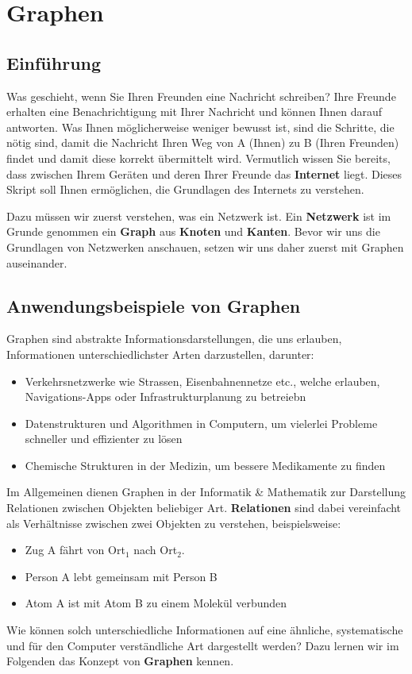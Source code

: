 \chapter{Graphen}

\section{Einführung}
Was geschieht, wenn Sie Ihren Freunden eine Nachricht schreiben? Ihre Freunde erhalten eine Benachrichtigung mit Ihrer Nachricht und können Ihnen darauf antworten. Was Ihnen möglicherweise weniger bewusst ist, sind die Schritte, die nötig sind, damit die Nachricht Ihren Weg von A (Ihnen) zu B (Ihren Freunden) findet und damit diese korrekt übermittelt wird. Vermutlich wissen Sie bereits, dass zwischen Ihrem Geräten und deren Ihrer Freunde das \textbf{Internet} liegt. Dieses Skript soll Ihnen ermöglichen, die Grundlagen des Internets zu verstehen.

Dazu müssen wir zuerst verstehen, was ein Netzwerk ist. Ein \textbf{Netzwerk} ist im Grunde genommen ein \textbf{Graph} aus \textbf{Knoten} und \textbf{Kanten}. Bevor wir uns die Grundlagen von Netzwerken anschauen, setzen wir uns daher zuerst mit Graphen auseinander.

\section{Anwendungsbeispiele von Graphen}
Graphen sind abstrakte Informationsdarstellungen, die uns erlauben, Informationen unterschiedlichster Arten darzustellen, darunter:
\begin{itemize}
    \item Verkehrsnetzwerke wie Strassen, Eisenbahnennetze etc., welche erlauben, Navigations-Apps oder Infrastrukturplanung zu betreiebn
    \item Datenstrukturen und Algorithmen in Computern, um vielerlei Probleme schneller und effizienter zu lösen
    \item Chemische Strukturen in der Medizin, um bessere Medikamente zu finden
\end{itemize}

Im Allgemeinen dienen Graphen in der Informatik \& Mathematik zur Darstellung Relationen zwischen Objekten beliebiger Art. \textbf{Relationen} sind dabei vereinfacht als Verhältnisse zwischen zwei Objekten zu verstehen, beispielsweise:
\begin{itemize}
\item Zug A fährt von Ort$_1$ nach Ort$_2$.
\item Person A lebt gemeinsam mit Person B
\item Atom A ist mit Atom B zu einem Molekül verbunden
\end{itemize}
Wie können solch unterschiedliche Informationen auf eine ähnliche, systematische und für den Computer verständliche Art dargestellt werden? Dazu lernen wir im Folgenden das Konzept von \textbf{Graphen} kennen.
